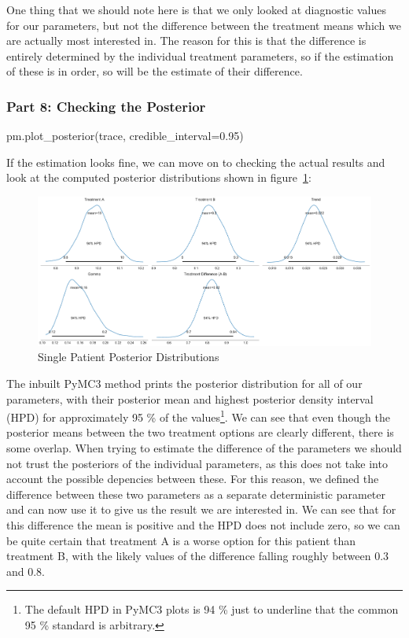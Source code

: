 \documentclass[12pt,a4paper,leqno]{report}
\theoremstyle{plain}
\theoremstyle{definition}
\theoremstyle{remark}
\begin{document}
One thing that we should note here is that we only looked at diagnostic values for our
parameters, but not the difference between the treatment means which we are actually
most interested in. The reason for this is that the difference is entirely determined
by the individual treatment parameters, so if the estimation of these is in order, so
will be the estimate of their difference.

\subsubsection*{Part 8: Checking the Posterior}

\bigskip
\begin{pyverbatim}[][fontsize=\footnotesize]
    pm.plot_posterior(trace, credible_interval=0.95)
\end{pyverbatim}
\smallskip

If the estimation looks fine, we can move on to checking the actual results and look at
the computed posterior distributions shown in figure\ \ref{singlepatientposteriors}:

\bigskip
\begin{figure}[H]
    \caption{Single Patient Posterior Distributions}\label{singlepatientposteriors}
    \bigskip
    \includegraphics[width=\textwidth,height=\textheight,keepaspectratio]{single_patient_posteriors.pdf}
\end{figure}
\bigskip

The inbuilt PyMC3 method prints the posterior distribution for all of our parameters,
with their posterior mean and highest posterior density interval (HPD) for approximately
95 \% of the values\footnote{The default HPD in PyMC3 plots is 94 \% just to underline that the common
95 \% standard is arbitrary.}. We can see that even though the posterior means between
the two treatment options are clearly different, there is some overlap. When
trying to estimate the difference of the parameters we should not trust the posteriors of
the individual parameters, as this does not take into account the possible depencies
between these. For this reason, we defined the difference between these two
parameters as a separate deterministic parameter and can now use it to give us the result we are interested in. We can see
that for this difference the mean is positive and the HPD does not include zero, so we can be quite certain that
treatment A is a worse option for this patient than treatment B, with the likely values of
the difference falling roughly between 0.3 and 0.8.
\end{document}
